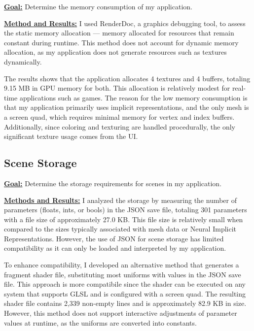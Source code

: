 \textbf{\underline{Goal:}}
Determine the memory consumption of my application.

\textbf{\underline{Method and Results:}}
I used RenderDoc, a graphics debugging tool, to assess the static memory allocation — memory allocated for resources that remain constant during runtime. This method does not account for dynamic memory allocation, as my application does not generate resources such as textures dynamically.

The results shows that the application allocates 4 textures and 4 buffers, totaling 9.15 MB in GPU memory for both. This allocation is relatively modest for real-time applications such as games. The reason for the low memory consumption is that my application primarily uses implicit representations, and the only mesh is a screen quad, which requires minimal memory for vertex and index buffers. Additionally, since coloring and texturing are handled procedurally, the only significant texture usage comes from the UI.


\subsection{Scene Storage}

\textbf{\underline{Goal:}}
Determine the storage requirements for scenes in my application.

\textbf{\underline{Methods and Results:}}
I analyzed the storage by measuring the number of parameters (floats, ints, or bools) in the JSON save file, totaling 301 parameters with a file size of approximately 27.0 KB. This file size is relatively small when compared to the sizes typically associated with mesh data or Neural Implicit Representations. However, the use of JSON for scene storage has limited compatibility as it can only be loaded and interpreted by my application.

To enhance compatibility, I developed an alternative method that generates a fragment shader file, substituting most uniforms with values in the JSON save file. This approach is more compatibile since the shader can be executed on any system that supports GLSL and is configured with a screen quad. The resulting shader file contains 2,339 non-empty lines and is approximately 82.9 KB in size. However, this method does not support interactive adjustments of parameter values at runtime, as the uniforms are converted into constants.